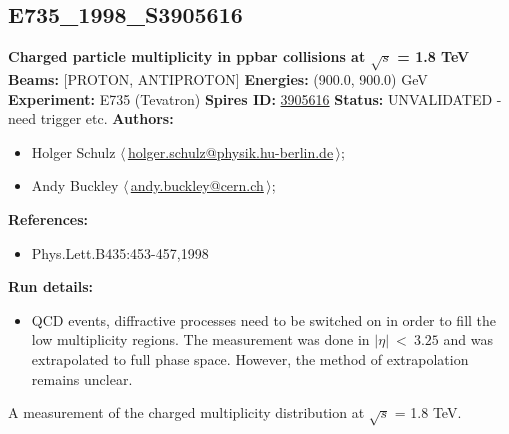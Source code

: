 \clearpage

\subsection[E735\_1998\_S3905616]{E735\_1998\_S3905616\,\cite{Alexopoulos:1998bi}}
\textbf{Charged particle multiplicity in ppbar collisions at \ensuremath{\sqrt{s}} = 1.8 TeV}\newline
\textbf{Beams:} [PROTON, ANTIPROTON] \newline
\textbf{Energies:} (900.0, 900.0) GeV \newline
\textbf{Experiment:} E735 (Tevatron) \newline
\textbf{Spires ID:} \href{http://www.slac.stanford.edu/spires/find/hep/www?rawcmd=key+3905616}{3905616}\newline
\textbf{Status:} UNVALIDATED - need trigger etc.\newline
\textbf{Authors:}
\begin{itemize}
  \item Holger Schulz $\langle\,$\href{mailto:holger.schulz@physik.hu-berlin.de}{holger.schulz@physik.hu-berlin.de}$\,\rangle$;
  \item Andy Buckley $\langle\,$\href{mailto:andy.buckley@cern.ch}{andy.buckley@cern.ch}$\,\rangle$;
\end{itemize}
\textbf{References:}
\begin{itemize}
  \item Phys.Lett.B435:453-457,1998
\end{itemize}
\textbf{Run details:}
\begin{itemize}

  \item QCD events, diffractive processes need to be switched on in order to fill the low multiplicity regions. The measurement was done in $\left|\eta\right| ~< ~3.25$ and was extrapolated to full phase space. However, the method of extrapolation remains unclear.\end{itemize}

\noindent A measurement of the charged multiplicity distribution at \ensuremath{\sqrt{s}} = 1.8 TeV.

\clearpage


